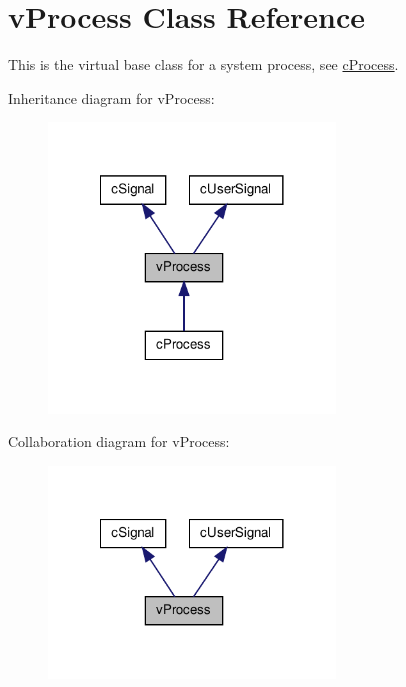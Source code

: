 \hypertarget{classv_process}{
\section{vProcess Class Reference}
\label{classv_process}
}


This is the virtual base class for a system process, see \hyperlink{classc_process}{cProcess}.  




Inheritance diagram for vProcess:
\nopagebreak
\begin{figure}[H]
\begin{center}
\leavevmode
\includegraphics[width=216pt]{classv_process__inherit__graph}
\end{center}
\end{figure}


Collaboration diagram for vProcess:
\nopagebreak
\begin{figure}[H]
\begin{center}
\leavevmode
\includegraphics[width=216pt]{classv_process__coll__graph}
\end{center}
\end{figure}
